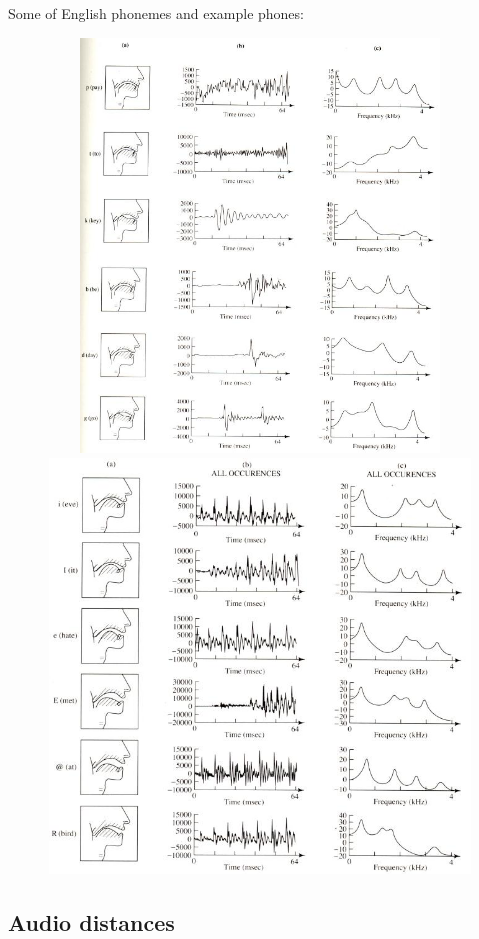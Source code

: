 \documentclass[12pt,a4paper,english]{article}
\begin{document}
\newpage
Some of English phonemes and example phones:
\begin{center}
    \includegraphics[height=11cm, width=16cm]{example_phones_1.jpg}
    \includegraphics[height=11cm, width=16cm]{example_phones_2.jpg}
\end {center}

\newpage
\subsection{Audio distances}
\end{document}
